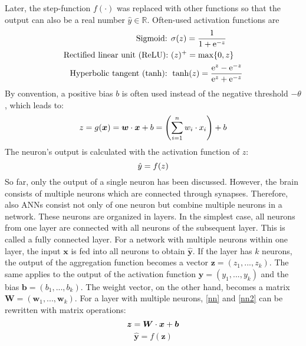 %
Later, the step-function \(f(\cdot)\) was replaced with other functions so that the output can also be a real number \(\hat{y} \in \mathbb{R}\). Often-used activation functions are
%
\begin{equation}\eqlbl{act_functions}%
	\begin{aligned}
		\text{Sigmoid: } & \sigma(z) = \frac{1}{1+\mathrm{e}^{-z}}\\
		\text{Rectified linear unit (ReLU): } & (z)^{+} = \max\{0, z\}\\
		\text{Hyperbolic tangent (tanh): }  & \tanh(z) = \frac{\mathrm{e}^{z}-\mathrm{e}^{-z}}{\mathrm{e}^{z}+\mathrm{e}^{-z}}
	\end{aligned}
\end{equation}
%
By convention, a positive bias $b$ is often used instead of the negative threshold $- \theta$, which leads to:
%
\begin{equation}\eqlbl{nn}%
	z = g(\boldsymbol{x}) = \boldsymbol{w} \cdot \boldsymbol{x} + b = \left( \sum_{i=1}^{n}w_i \cdot x_i \right) + b
\end{equation}
%
The neuron's output is calculated with the activation function of $z$:
%
\begin{equation}\eqlbl{nn2}%
	\hat{y} = f(z)
\end{equation}
%
So far, only the output of a single neuron has been discussed.
However, the brain consists of multiple neurons which are connected through synapses.
Therefore, also ANNs consist not only of one neuron but combine multiple neurons in a network. 
These neurons are organized in layers.
In the simplest case, all neurons from one layer are connected with all neurons of the subsequent layer. This is called a fully connected layer.
For a network with multiple neurons within one layer, the input $\boldsymbol{x}$ is fed into all neurons to obtain $\boldsymbol{\hat{y}}$.
If the layer has $k$ neurons, the output of the aggregation function becomes a vector $\boldsymbol{z} = (z_1, ..., z_k)$. The same applies to the output of the activation function $\boldsymbol{y} = (y_1, ..., y_k)$ and the bias $\boldsymbol{b} = (b_1, ..., b_k)$. The weight vector, on the other hand, becomes a matrix $\boldsymbol{W} = (\boldsymbol{w}_1, ..., \boldsymbol{w}_k)$. For a layer with multiple neurons, \eqref{nn} and \eqref{nn2} can be rewritten with matrix operations:
%
\begin{equation}\eqlbl{nn3}%
	\boldsymbol{z} = \boldsymbol{W} \cdot \boldsymbol{x} + \boldsymbol{b}
\end{equation}
\begin{equation}
	\hat{\boldsymbol{y}} = f(\boldsymbol{z})
\end{equation}
